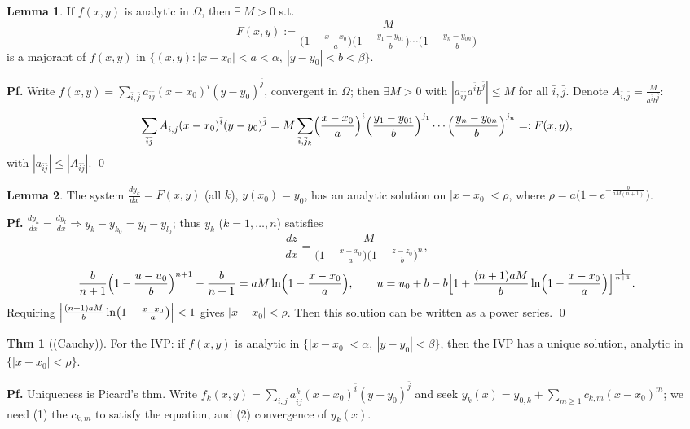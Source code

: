 \documentclass[11pt]{article}
\theoremstyle{definition}
\newtheorem*{theorem}{Thm}
\newtheorem*{lemma}{Lemma}
\theoremstyle{remark}
\begin{document}
\begin{lemma}
If $f(x,y)$ is analytic in $\Omega$, then $\exists\ M>0$ s.t.
\[
F(x,y):=\frac{M}{\bigl(1-\frac{x-x_0}{a}\bigr)\bigl(1-\frac{y_1-y_{01}}{b}\bigr)\cdots\bigl(1-\frac{y_n-y_{0n}}{b}\bigr)}
\]
is a majorant of $f(x,y)$ in $\bigl\{(x,y): |x-x_0|<a<\alpha,\ |y-y_0|<b<\beta\bigr\}$.

\textbf{Pf.} Write $f(x,y)=\sum_{\bar{i},\bar{j}}a_{\bar{i}\bar{j}}(x-x_0)^{\bar{i}}(y-y_0)^{\bar{j}}$,
convergent in $\Omega$; then $\exists M>0$ with $|a_{\bar{i}\bar{j}}a^{\bar{i}}b^{\bar{j}}|\le M$ for
all $\bar{i},\bar{j}$. Denote $A_{\bar{i},\bar{j}}=\frac{M}{a^{\bar{i}}b^{\bar{j}}}$:
\[
\sum_{\bar{i}\bar{j}}A_{\bar{i},\bar{j}}(x-x_0)^{\bar{i}}(y-y_0)^{\bar{j}}
=M\sum_{\bar{i},\bar{j}_k}\Bigl(\frac{x-x_0}{a}\Bigr)^{\bar{i}}\Bigl(\frac{y_1-y_{01}}{b}\Bigr)^{\bar{j}_1}\cdots\Bigl(\frac{y_n-y_{0n}}{b}\Bigr)^{\bar{j}_n}
=:F(x,y),
\]
with $|a_{\bar{i}\bar{j}}|\le|A_{\bar{i}\bar{j}}|$. \qed
\end{lemma}

\begin{lemma}
The system $\frac{dy_k}{dx}=F(x,y)$ (all $k$), $y(x_0)=y_0$, has an analytic solution on
$|x-x_0|<\rho$, where $\rho=a\bigl(1-e^{-\frac{b}{aM(n+1)}}\bigr)$.

\textbf{Pf.} $\frac{dy_k}{dx}=\frac{dy_l}{dx} \Rightarrow y_k-y_{k_0}=y_l-y_{l_0}$; thus $y_k$
($k=1,\dots,n$) satisfies
\[
\frac{dz}{dx}=\frac{M}{\bigl(1-\frac{x-x_0}{a}\bigr)\bigl(1-\frac{z-z_0}{b}\bigr)^n},
\]
\[
\frac{b}{n+1}\Bigl(1-\frac{u-u_0}{b}\Bigr)^{n+1}-\frac{b}{n+1}=aM\ln\Bigl(1-\frac{x-x_0}{a}\Bigr),
\qquad
u=u_0+b-b\Bigl[1+\frac{(n+1)aM}{b}\ln\Bigl(1-\frac{x-x_0}{a}\Bigr)\Bigr]^{\frac{1}{n+1}}.
\]
Requiring $\Bigl|\frac{(n+1)aM}{b}\ln\bigl(1-\frac{x-x_0}{a}\bigr)\Bigr|<1$ gives $|x-x_0|<\rho$.
Then this solution can be written as a power series. \qed
\end{lemma}

\begin{theorem}[(Cauchy)]
For the IVP: if $f(x,y)$ is analytic in $\{|x-x_0|<\alpha,\ |y-y_0|<\beta\}$, then the IVP has a
unique solution, analytic in $\{|x-x_0|<\rho\}$.
\end{theorem}

\textbf{Pf.} Uniqueness is Picard's thm. Write
$f_k(x,y)=\sum_{\bar{i},\bar{j}}a^k_{\bar{i}\bar{j}}(x-x_0)^{\bar{i}}(y-y_0)^{\bar{j}}$ and seek
$y_k(x)=y_{0,k}+\sum_{m\ge1}c_{k,m}(x-x_0)^m$; we need (1) the $c_{k,m}$ to satisfy the equation,
and (2) convergence of $y_k(x)$.
\end{document}
